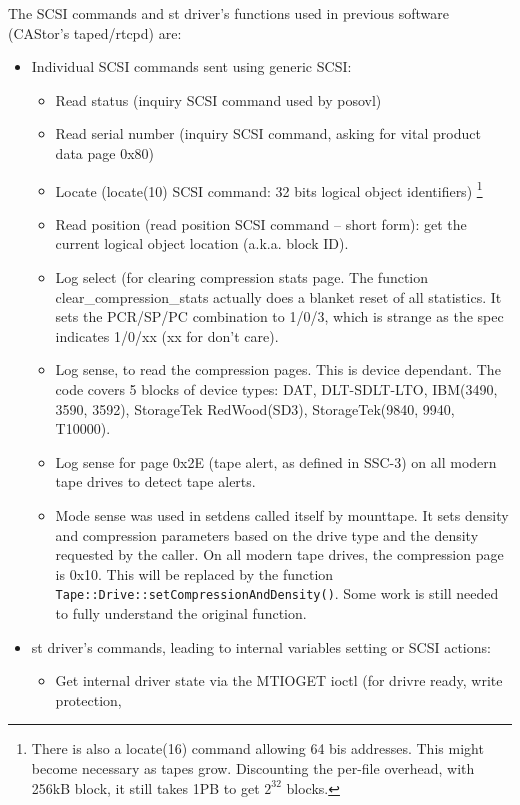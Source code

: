 The SCSI commands and st driver's functions used in previous software (CAStor's taped/rtcpd) are:
\begin{itemize}
\item Individual SCSI commands sent using generic SCSI:
  \begin{itemize}
    \item Read status (inquiry SCSI command used by posovl)
    \item Read serial number (inquiry SCSI command, asking for vital product data page 0x80)
    \item Locate (locate(10) SCSI command: 32 bits logical object identifiers)
                      \footnote{There is also a locate(16) command allowing 64 bis addresses.
                      This might become necessary as tapes grow. Discounting the per-file overhead,
                      with 256kB block, it still takes 1PB to get $2^{32}$ blocks.}
    \item Read position (read position SCSI command -- short form): get the current logical object
          location (a.k.a. block ID).
    \item Log select (for clearing compression stats page. The function clear\_compression\_stats
          actually does a blanket reset of all statistics. It sets the PCR/SP/PC combination
          to 1/0/3, which is strange as the spec indicates 1/0/xx (xx for don't care).
    \item Log sense, to read the compression pages. This is device dependant. The code covers
          5 blocks of device types: DAT, DLT-SDLT-LTO, IBM(3490, 3590, 3592), StorageTek RedWood(SD3),
          StorageTek(9840, 9940, T10000).
    \item Log sense for page 0x2E (tape alert, as defined in SSC-3) on all modern tape drives to detect tape alerts.
    \item Mode sense was used in setdens called itself by mounttape. It sets density and compression
          parameters based on the drive type and the density requested by the caller. On all modern tape drives,
          the compression page is 0x10. This will be replaced by the function \verb#Tape::Drive::setCompressionAndDensity()#.
          Some work is still needed to fully understand the original function.
  \end{itemize}
\item st driver's commands, leading to internal variables setting or SCSI actions:
  \begin{itemize}
    \item Get internal driver state via the MTIOGET ioctl (for drivre ready, write protection, 

\end{itemize}
\end{itemize}
